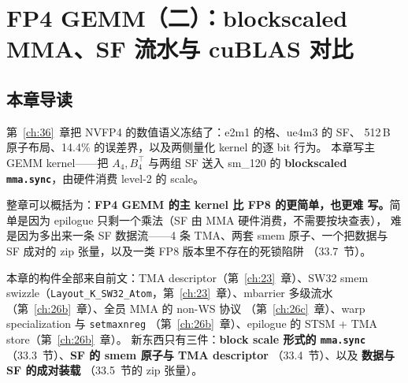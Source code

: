 \chapter{FP4 GEMM（二）：blockscaled MMA、SF 流水与 cuBLAS 对比}\label{ch:37}

\section{本章导读}

第~\ref{ch:36}~章把 NVFP4 的数值语义冻结了：e2m1 的格、ue4m3 的 SF、
512\,B 原子布局、14.4\% 的误差界，以及两侧量化 kernel 的逐 bit 行为。
本章写主 GEMM kernel——把 $A_4,B_4^{\top}$ 与两组 SF 送入 sm\_120 的
\textbf{blockscaled \texttt{mma.sync}}，由硬件消费 level-2 的 scale。

整章可以概括为：\textbf{FP4 GEMM 的主 kernel 比 FP8 的更简单，也更难
写。}简单是因为 epilogue 只剩一个乘法（SF 由 MMA 硬件消费，不需要按块查表），
难是因为多出来一条 SF 数据流——4 条 TMA、两套 smem 原子、一个把数据与 SF
成对的 zip 张量，以及一类 FP8 版本里不存在的死锁陷阱
（33.7~节）。

本章的构件全部来自前文：TMA descriptor（第~\ref{ch:23}~章）、SW32 smem
swizzle（\texttt{Layout\_K\_SW32\_Atom}，第~\ref{ch:23}~章）、mbarrier
多级流水（第~\ref{ch:26b}~章）、全员 MMA 的 non-WS 协议
（第~\ref{ch:26c}~章）、warp specialization 与 \texttt{setmaxnreg}
（第~\ref{ch:26b}~章）、epilogue 的 STSM + TMA store（第~\ref{ch:26b}~章）。
新东西只有三件：\textbf{block scale 形式的 \texttt{mma.sync}}
（33.3~节）、\textbf{SF 的 smem 原子与 TMA descriptor}
（33.4~节）、以及 \textbf{数据与 SF 的成对装载}
（33.5~节的 zip 张量）。

